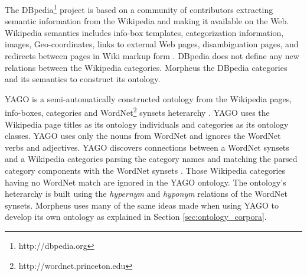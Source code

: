 
The DBpedia\footnote{http://dbpedia.org} project is based on a community of contributors extracting semantic information from the Wikipedia and making it available on the Web.  Wikipedia semantics includes info-box templates, categorization information,  images, Geo-coordinates, links to external Web pages, disambiguation pages, and redirects between pages in Wiki markup form \cite{Bizer2009}.  DBpedia does not define any new relations between the Wikipedia categories.  Morpheus the DBpedia categories and its semantics to construct its ontology.

YAGO is a semi-automatically constructed ontology from the Wikipedia pages, info-boxes, categories and WordNet\footnote{http://wordnet.princeton.edu} synsets heterarchy \cite{Suchanek2009phd}. YAGO uses the Wikipedia page titles as its ontology individuals and categories as its ontology classes. YAGO uses only the nouns from WordNet and ignores the WordNet verbs and adjectives.  YAGO discovers connections between a WordNet synsets and a Wikipedia categories parsing the category names and matching the parsed category components with the WordNet synsets \cite{Suchanek2009phd}. Those Wikipedia categories having no WordNet match are ignored in the YAGO ontology.  The ontology's heterarchy is built using the \textit{hypernym} and \textit{hyponym} relations of the WordNet synsets.  Morpheus uses many of the same ideas made when using YAGO to develop its own ontology as explained in Section \ref{sec:ontology_corpora}.

